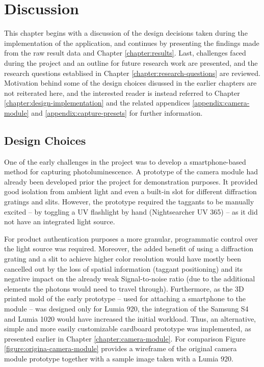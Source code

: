 \documentclass[thesis.tex]{subfiles}
\begin{document}
\chapter{Discussion}
\label{chapter:discussion}

This chapter begins with a discussion of the design decisions taken during the implementation of the application, and continues by presenting the findings made from the raw result data and Chapter \ref{chapter:results}. Last, challenges faced during the project and an outline for future research work are presented, and the research questions establised in Chapter \ref{chapter:research-questions} are reviewed. Motivation behind some of the design choices disussed in the earlier chapters are not reiterated here, and the interested reader is instead referred to Chapter \ref{chapter:design-implementation} and the related appendices \ref{appendix:camera-module} and \ref{appendix:capture-presets} for further information.

\section{Design Choices}

One of the early challenges in the project was to develop a smartphone-based method for capturing photoluminescence. A prototype of the camera module had already been developed prior the project for demonstration purposes. It provided good isolation from ambient light and even a built-in slot for different diffraction gratings and slits. However, the prototype required the taggants to be manually excited -- by toggling a UV flashlight by hand (Nightsearcher UV 365) -- as it did not have an integrated light source.

For product authentication purposes a more granular, programmatic control over the light source was required. Moreover, the added benefit of using a diffraction grating and a slit to achieve higher color resolution would have mostly been cancelled out by the loss of spatial information (taggant positioning) and its negative impact on the already weak Signal-to-noise ratio (due to the additional elements the photons would need to travel through). Furthermore, as the 3D printed mold of the early prototype -- used for attaching a smartphone to the module -- was designed only for Lumia 920, the integration of the Samsung S4 and Lumia 1020 would have increased the initial workload. Thus, an alternative, simple and more easily customizable cardboard prototype was implemented, as presented earlier in Chapter \ref{chapter:camera-module}. For comparison Figure \ref{figure:origina-camera-module} provides a wireframe of the original camera module prototype together with a sample image taken with a Lumia 920.
\end{document}
